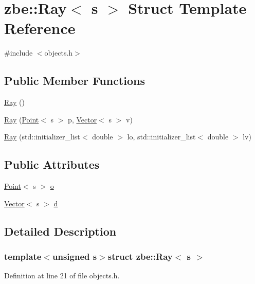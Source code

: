 \hypertarget{structzbe_1_1_ray}{}\section{zbe\+:\+:Ray$<$ s $>$ Struct Template Reference}
\label{structzbe_1_1_ray}


{\ttfamily \#include $<$objects.\+h$>$}

\subsection*{Public Member Functions}
\begin{DoxyCompactItemize}
\item 
\hyperlink{structzbe_1_1_ray_a5737d9d295af028eff8b86c7a9598173}{Ray} ()
\item 
\hyperlink{structzbe_1_1_ray_aa06cb424ee2e09cfe37ef3f3891622ae}{Ray} (\hyperlink{classzbe_1_1_point}{Point}$<$ s $>$ p, \hyperlink{classzbe_1_1_vector}{Vector}$<$ s $>$ v)
\item 
\hyperlink{structzbe_1_1_ray_a767a4a7c859d2227fe6c2c16733f9911}{Ray} (std\+::initializer\+\_\+list$<$ double $>$ lo, std\+::initializer\+\_\+list$<$ double $>$ lv)
\end{DoxyCompactItemize}
\subsection*{Public Attributes}
\begin{DoxyCompactItemize}
\item 
\hyperlink{classzbe_1_1_point}{Point}$<$ s $>$ \hyperlink{structzbe_1_1_ray_a156f5831d3d67cb661b6c8b64bd10546}{o}
\item 
\hyperlink{classzbe_1_1_vector}{Vector}$<$ s $>$ \hyperlink{structzbe_1_1_ray_a9b3d843a1155dc0746c3c28d0025b482}{d}
\end{DoxyCompactItemize}


\subsection{Detailed Description}
\subsubsection*{template$<$unsigned s$>$struct zbe\+::\+Ray$<$ s $>$}



Definition at line 21 of file objects.\+h.




